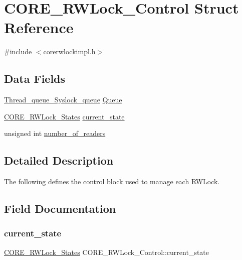 \hypertarget{structCORE__RWLock__Control}{}\section{C\+O\+R\+E\+\_\+\+R\+W\+Lock\+\_\+\+Control Struct Reference}
\label{structCORE__RWLock__Control}


{\ttfamily \#include $<$corerwlockimpl.\+h$>$}

\subsection*{Data Fields}
\begin{DoxyCompactItemize}
\item 
\mbox{\hyperlink{structThread__queue__Syslock__queue}{Thread\+\_\+queue\+\_\+\+Syslock\+\_\+queue}} \mbox{\hyperlink{structCORE__RWLock__Control_a7c5ab480ce03e1253395130577270f06}{Queue}}
\item 
\mbox{\hyperlink{group__RTEMSScoreRWLock_ga52fe4c69d9a2c96c1022416e951b90ec}{C\+O\+R\+E\+\_\+\+R\+W\+Lock\+\_\+\+States}} \mbox{\hyperlink{structCORE__RWLock__Control_ad7818792e24f52dee93de03b9dbcb99f}{current\+\_\+state}}
\item 
unsigned int \mbox{\hyperlink{structCORE__RWLock__Control_ab8abb29ef0dcb206089b4806c0aac999}{number\+\_\+of\+\_\+readers}}
\end{DoxyCompactItemize}


\subsection{Detailed Description}
The following defines the control block used to manage each R\+W\+Lock. 

\subsection{Field Documentation}
\mbox{\label{structCORE__RWLock__Control_ad7818792e24f52dee93de03b9dbcb99f}} 
\subsubsection{\texorpdfstring{current\_state}{current\_state}}
{\footnotesize\ttfamily \mbox{\hyperlink{group__RTEMSScoreRWLock_ga52fe4c69d9a2c96c1022416e951b90ec}{C\+O\+R\+E\+\_\+\+R\+W\+Lock\+\_\+\+States}} C\+O\+R\+E\+\_\+\+R\+W\+Lock\+\_\+\+Control\+::current\+\_\+state}

